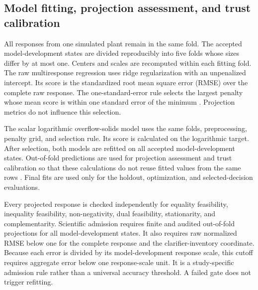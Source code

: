 \documentclass[a4paper,fleqn]{cas-sc}
\begin{document}
\subsection{Model fitting, projection assessment, and trust calibration}

All responses from one simulated plant remain in the same fold. The accepted model-development states are divided reproducibly into five folds whose sizes differ by at most one. Centers and scales are recomputed within each fitting fold. The raw multiresponse regression uses ridge regularization with an unpenalized intercept. Its score is the standardized root mean square error (RMSE) over the complete raw response. The one-standard-error rule selects the largest penalty whose mean score is within one standard error of the minimum \citep{Hastie2009}. Projection metrics do not influence this selection.

The scalar logarithmic overflow-solids model uses the same folds, preprocessing, penalty grid, and selection rule. Its score is calculated on the logarithmic target. After selection, both models are refitted on all accepted model-development states. Out-of-fold predictions are used for projection assessment and trust calibration so that these calculations do not reuse fitted values from the same rows \citep{Hastie2009}. Final fits are used only for the holdout, optimization, and selected-decision evaluations.

Every projected response is checked independently for equality feasibility, inequality feasibility, non-negativity, dual feasibility, stationarity, and complementarity. Scientific admission requires finite and audited out-of-fold projections for all model-development states. It also requires raw normalized RMSE below one for the complete response and the clarifier-inventory coordinate. Because each error is divided by its model-development response scale, this cutoff requires aggregate error below one response-scale unit. It is a study-specific admission rule rather than a universal accuracy threshold. A failed gate does not trigger refitting.
\end{document}
